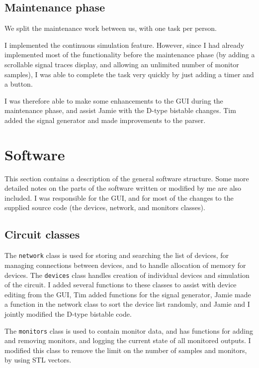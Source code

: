 \documentclass[a4paper,10pt]{article}
\begin{document}
\subsection{Maintenance phase}
We split the maintenance work between us, with one task per person.

I implemented the continuous simulation feature. However, since I had already implemented most of the functionality before the maintenance phase (by adding a scrollable signal traces display, and allowing an unlimited number of monitor samples), I was able to complete the task very quickly by just adding a timer and a button. 

I was therefore able to make some enhancements to the GUI during the maintenance phase, and assist Jamie with the D-type bistable changes. Tim added the signal generator and made improvements to the parser. 

\section{Software}
This section contains a description of the general software structure. Some more detailed notes on the parts of the software written or modified by me are also included. I was responsible for the GUI, and for most of the changes to the supplied source code (the devices, network, and monitors classes). 

\subsection{Circuit classes}
The \texttt{network} class is used for storing and searching the list of devices, for managing connections between devices, and to handle allocation of memory for devices. The \texttt{devices} class handles creation of individual devices and simulation of the circuit. I added several functions to these classes to assist with device editing from the GUI, Tim added functions for the signal generator, Jamie made a function in the network class to sort the device list randomly, and Jamie and I jointly modified the D-type bistable code. 

The \texttt{monitors} class is used to contain monitor data, and has functions for adding and removing monitors, and logging the current state of all monitored outputs. I modified this class to remove the limit on the number of samples and monitors, by using STL vectors. 
\end{document}
